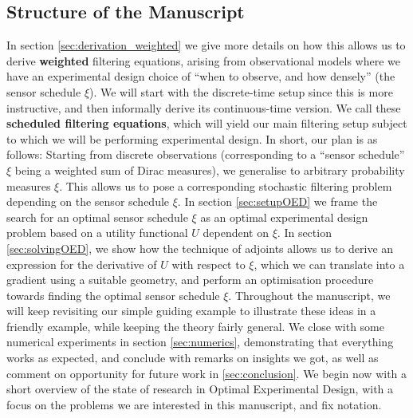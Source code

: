 \documentclass[10pt]{article}
\numberwithin{equation}{section}
\numberwithin{figure}{section}
\theoremstyle{remark}
\begin{document}
\subsection{Structure of the Manuscript}
In section \ref{sec:derivation_weighted} we give more details on how this allows us to derive \textbf{weighted} filtering equations, arising from observational models where we have an experimental design choice of ``when to observe, and how densely'' (the sensor schedule $\xi$). We will start with the discrete-time setup since this is more instructive, and then informally derive its continuous-time version. We call these \textbf{scheduled filtering equations}, which will yield our main filtering setup subject to which we will be performing experimental design. In short, our plan is as follows: Starting from discrete observations (corresponding to a ``sensor schedule'' $\xi$ being a weighted sum of Dirac measures), we generalise to arbitrary probability measures $\xi$. This allows us to pose a corresponding stochastic filtering problem depending on the sensor schedule $\xi$. In section \ref{sec:setupOED} we frame the search for an optimal sensor schedule $\xi$ as an optimal experimental design problem based on a utility functional $U$ dependent on $\xi$. In section \ref{sec:solvingOED}, we show how the technique of adjoints allows us to derive an expression for the derivative of $U$ with respect to $\xi$, which we can translate into a gradient using a suitable geometry, and perform an optimisation procedure towards finding the optimal sensor schedule $\xi$. Throughout the manuscript, we will keep revisiting our simple guiding example to illustrate these ideas in a friendly example, while keeping the theory fairly general. We close with some numerical experiments in section \ref{sec:numerics}, demonstrating that everything works as expected, and conclude with remarks on insights we got, as well as comment on opportunity for future work in \ref{sec:conclusion}. We begin now with a short overview of the state of research in Optimal Experimental Design, with a focus on the problems we are interested in this manuscript, and fix notation. 
\end{document}
